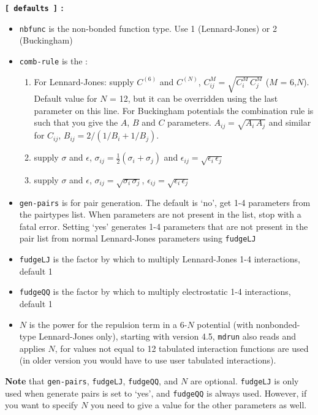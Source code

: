 {\bf {\tt [~defaults~]} :}
\begin{itemize}
\item {\tt nbfunc} is the non-bonded function type. Use 1 (Lennard-Jones) or 2 (Buckingham)
\item {\tt comb-rule} is the : 
\begin{enumerate}
\item For Lennard-Jones: supply $C^{(6)}$ and $C^{(N)}$,
$C^{M}_{ij}=\sqrt{C^M_i\,C^M_j}$ ($M$ = 6,$N$).
Default value for $N$ = 12, but it can be
overridden using the last parameter on this line.
For Buckingham potentials the combination rule is such that you give the
$A$, $B$ and $C$ parameters. $A_{ij} = \sqrt{A_i\, A_j}$ and similar for 
$C_{ij}$, $B_{ij} = 2/(1/B_i + 1/B_j)$.
\item supply $\sigma$ and $\epsilon$,
$\sigma_{ij}=\frac{1}{2}(\sigma_i+\sigma_j)$ and 
$\epsilon_{ij}=\sqrt{\epsilon_i\,\epsilon_j}$
\item supply $\sigma$ and $\epsilon$, $\sigma_{ij}=\sqrt{\sigma_i\,\sigma_j}$,
$\epsilon_{ij}=\sqrt{\epsilon_i\,\epsilon_j}$
\end{enumerate}
\item {\tt gen-pairs} is for pair generation. The default is `no', {\ie} 
get 1-4 parameters from the pairtypes list. When parameters
are not present in the list, stop with a fatal error.
Setting `yes' generates 1-4 parameters that are not present in the pair list
from normal Lennard-Jones parameters using {\tt fudgeLJ}
\item {\tt fudgeLJ} is the factor by which to multiply Lennard-Jones 1-4 interactions, default 1
\item {\tt fudgeQQ} is the factor by which to multiply electrostatic 1-4 interactions, default 1
\item $N$ is the power for the repulsion term in a 6-$N$ potential (with 
nonbonded-type Lennard-Jones only), starting with {\gromacs} version 4.5,
{\tt mdrun} also reads and applies $N$, for values not equal to 12 tabulated
interaction functions are used
(in older version you would have to use user tabulated interactions).
\end{itemize}
{\bf Note} that {\tt gen-pairs}, {\tt fudgeLJ}, {\tt fudgeQQ}, and $N$ are optional.
{\tt fudgeLJ} is only used when generate pairs is set to `yes', and
{\tt fudgeQQ} is always used. However, if you
want to specify $N$ you need to give a value for the other parameters as well.

%

